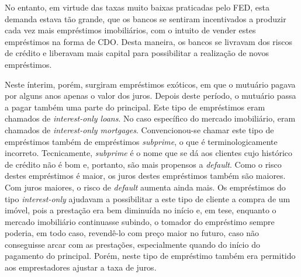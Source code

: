 \documentclass[
	12pt,				%
	oneside,			%
	a4paper,			%
	chapter=TITLE,		%
	section=TITLE,		%
	english,			%
	brazil				%
	]{abntex2}
\begin{document}
\begin{refsection}
No entanto, em virtude das taxas muito baixas praticadas pelo \gls{FED}, esta
demanda estava tão grande, que os bancos se sentiram incentivados a produzir
cada vez mais empréstimos imobiliários, com o intuito de vender estes
empréstimos na forma de \gls{CDO}. Desta maneira, os bancos se livravam dos
riscos de crédito e liberavam mais capital para possibilitar a realização de
novos empréstimos.

Neste ínterim, porém, surgiram empréstimos exóticos, em que o mutuário pagava
por alguns anos apenas o valor dos juros. Depois deste período, o mutuário passa
a pagar também uma parte do principal. Este tipo de empréstimos eram chamados
de \emph{interest-only loans}. No caso específico do mercado imobiliário, eram
chamados de \emph{interest-only mortgages}. Convencionou-se chamar este tipo de
empréstimos também de empréstimos \emph{subprime}, o que é terminologicamente
incorreto. Tecnicamente, \emph{subprime} é o nome que se dá aos clientes cujo
histórico de crédito não é bom e, portanto, são mais propensos a \emph{default}. Como
o risco destes empréstimos é maior, os juros destes empréstimos também são
maiores. Com juros maiores, o risco de \emph{default} aumenta ainda mais. Os
empréstimos do tipo \emph{interest-only} ajudavam a possibilitar a este tipo de
cliente a compra de um imóvel, pois a prestação era bem diminuída no início e,
em tese, enquanto o mercado imobiliário continuasse subindo, o tomador do
empréstimo sempre poderia, em todo caso, revendê-lo com preço maior no futuro,
caso não conseguisse arcar com as prestações, especialmente quando do início do
pagamento do principal. Porém, neste tipo de empréstimo também era permitido aos
emprestadores ajustar a taxa de juros.


\end{refsection}
\end{document}
